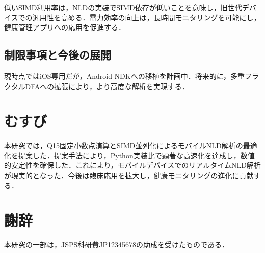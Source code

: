 \documentclass[paper]{ieice}
\begin{document}
低いSIMD利用率は，NLDの実装でSIMD依存が低いことを意味し，旧世代デバイスでの汎用性を高める．電力効率の向上は，長時間モニタリングを可能にし，健康管理アプリへの応用を促進する．

\subsection{制限事項と今後の展開}

現時点ではiOS専用だが，Android NDKへの移植を計画中．将来的に，多重フラクタルDFAへの拡張により，より高度な解析を実現する．

\section{むすび}

本研究では，Q15固定小数点演算とSIMD並列化によるモバイルNLD解析の最適化を提案した．提案手法により，Python実装比で顕著な高速化を達成し，数値的安定性を確保した．これにより，モバイルデバイスでのリアルタイムNLD解析が現実的となった．今後は臨床応用を拡大し，健康モニタリングの進化に貢献する．

\section*{謝辞}
本研究の一部は，JSPS科研費JP12345678の助成を受けたものである．
\end{document}
